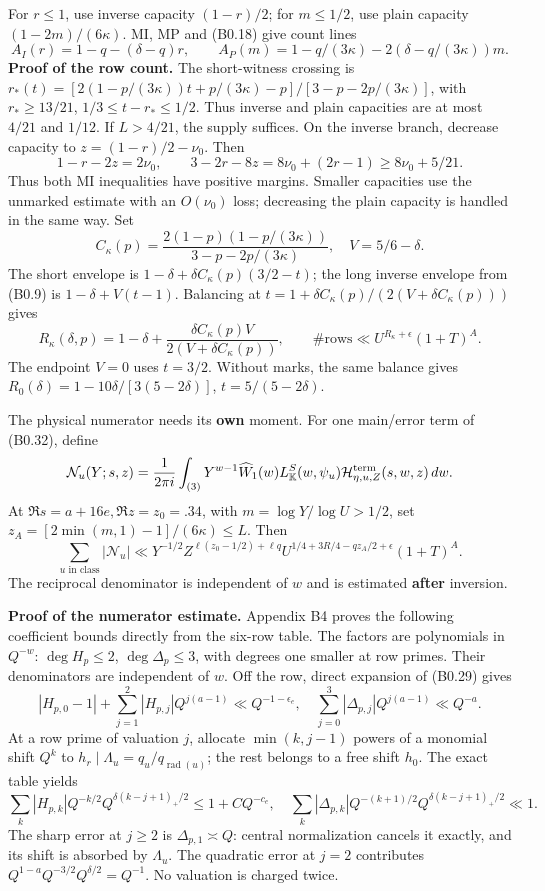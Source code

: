 \documentclass[11pt,a4paper]{article}
\begin{document}
For \(r\le1\), use inverse capacity \((1-r)/2\); for \(m\le1/2\), use
plain capacity \((1-2m)/(6\kappa)\). MI, MP and (B0.18) give count lines
\[
A_I(r)=1-q-(\delta-q)r,\qquad
A_P(m)=1-q/(3\kappa)-2(\delta-q/(3\kappa))m.
\tag{B0.38}
\] \textbf{Proof of the row count.} The short-witness crossing is
\(r_*(t)=[2(1-p/(3\kappa))t+p/(3\kappa)-p]/[3-p-2p/(3\kappa)]\), with
\(r_*\ge13/21\), \(1/3\le t-r_*\le1/2\). Thus inverse and plain
capacities are at most \(4/21\) and \(1/12\). If \(L>4/21\), the supply
suffices. On the inverse branch, decrease capacity to
\(z=(1-r)/2-\nu_0\). Then \[
1-r-2z=2\nu_0,\qquad 3-2r-8z=8\nu_0+(2r-1)\ge8\nu_0+5/21.
\tag{B0.39}
\] Thus both MI inequalities have positive margins. Smaller capacities
use the unmarked estimate with an \(O(\nu_0)\) loss; decreasing the
plain capacity is handled in the same way. Set \[
C_\kappa(p)=\frac{2(1-p)(1-p/(3\kappa))}{3-p-2p/(3\kappa)},\quad V=5/6-\delta.
\] The short envelope is \(1-\delta+\delta C_\kappa(p)(3/2-t)\); the
long inverse envelope from (B0.9) is \(1-\delta+V(t-1)\). Balancing at
\(t=1+\delta C_\kappa(p)/(2(V+\delta C_\kappa(p)))\) gives \[
R_\kappa(\delta,p)=1-\delta+
\frac{\delta C_\kappa(p)V}{2(V+\delta C_\kappa(p))},\qquad
\#\text{rows}\ll U^{R_\kappa+\epsilon}(1+T)^A.
\tag{B0.40}
\] The endpoint \(V=0\) uses \(t=3/2\). Without marks, the same balance
gives \(R_0(\delta)=1-10\delta/[3(5-2\delta)]\), \(t=5/(5-2\delta)\).

The physical numerator needs its \textbf{own} moment. For one main/error
term of (B0.32), define \[
\mathcal N_u(Y;s,z)=\frac1{2\pi i}\int_{(3)}Y^{w-1}\widehat W_1(w)L_{\mathbb K}^S(w,\psi_u)\mathcal H^{\rm term}_{\eta,u,Z}(s,w,z)\,dw.
\] At \(\Re s=a+16e,\allowbreak{}\Re z=z_0=.34\), with \(m=\log Y/\log U>1/2\), set
\(z_A=[2\min(m,\allowbreak{}1)-1]/(6\kappa)\le L\). Then \[
\sum_{u\text{ in class}}|\mathcal N_u|
\ll Y^{-1/2}Z^{\ell(z_0-1/2)+\ell q}
U^{1/4+3R/4-qz_A/2+\epsilon}(1+T)^A.
\tag{B0.41}
\] The reciprocal denominator is independent of \(w\) and is estimated
\textbf{after} inversion.

\textbf{Proof of the numerator estimate.} Appendix B4 proves the
following coefficient bounds directly from the six-row table. The
factors are polynomials in \(Q^{-w}\): \(\deg H_p\le2\),
\(\deg\Delta_p\le3\), with degrees one smaller at row primes. Their
denominators are independent of \(w\). Off the row, direct expansion of
(B0.29) gives \[
|H_{p,0}-1|+\sum_{j=1}^2|H_{p,j}|Q^{j(a-1)}\ll Q^{-1-\epsilon_e},\quad
\sum_{j=0}^3|\Delta_{p,j}|Q^{j(a-1)}\ll Q^{-a}.
\tag{B0.42}
\] At a row prime of valuation \(j\), allocate \(\min(k,\allowbreak{}j-1)\) powers of
a monomial shift \(Q^k\) to
\(h_r\mid\Lambda_u=q_u/q_{\operatorname{rad}(u)}\); the rest belongs to
a free shift \(h_0\). The exact table yields \[
\sum_k|H_{p,k}|Q^{-k/2}Q^{\delta(k-j+1)_+/2}\le1+CQ^{-c_e},\quad
\sum_k|\Delta_{p,k}|Q^{-(k+1)/2}Q^{\delta(k-j+1)_+/2}\ll1.
\tag{B0.43}
\] The sharp error at \(j\ge2\) is \(\Delta_{p,\allowbreak{}1}\asymp Q\): central
normalization cancels it exactly, and its shift is absorbed by
\(\Lambda_u\). The quadratic error at \(j=2\) contributes
\(Q^{1-a}Q^{-3/2}Q^{\delta/2}=Q^{-1}\). No valuation is charged twice.
\end{document}
